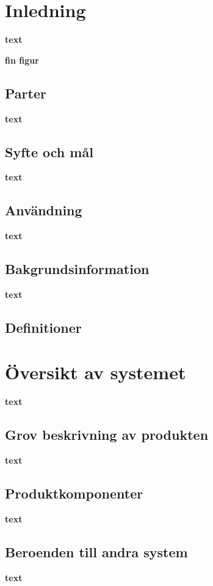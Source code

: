 \documentclass[a4paper,titlepage,12pt]{article}
\begin{document}

	\newpage

	\section{Inledning}
	\textbf{text}

	\textbf{fin figur}

	\subsection{Parter}
	\textbf{text}
	\subsection{Syfte och mål}
	\textbf{text}
	\subsection{Användning}
	\textbf{text}
	\subsection{Bakgrundsinformation}
	\textbf{text}
	\subsection{Definitioner}


	\section{Översikt av systemet}
	\textbf{text}
	\subsection{Grov beskrivning av produkten}
	\textbf{text}
	\subsection{Produktkomponenter}
	\textbf{text}
	\subsection{Beroenden  till andra system}
	\textbf{text}
\end{document}

